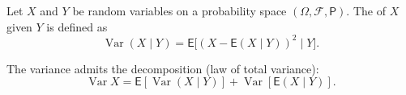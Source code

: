 Let $X$ and $Y$ be random variables on a probability space $(\Omega, \mathcal{F}, \mathsf{P})$. The  of $X$ given $Y$ is defined as
$$\operatorname{Var}(X \mid Y) = \mathsf{E}\bigl[(X - \mathsf{E}(X \mid Y))^2 \mid Y\bigr].$$

The variance admits the decomposition (law of total variance):
$$\operatorname{Var} X = \mathsf{E}[\operatorname{Var}(X \mid Y)] + \operatorname{Var}[\mathsf{E}(X \mid Y)].$$
